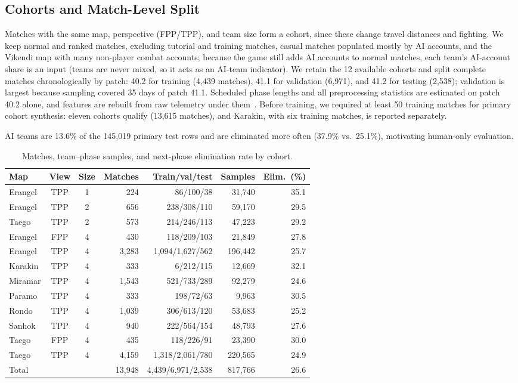 \documentclass[sigconf,anonymous,nonacm]{acmart}
\begin{document}
\subsection{Cohorts and Match-Level Split}
\label{sec:method:cohort}
Matches with the same map, perspective (FPP/TPP), and team size form a cohort, since these change travel distances and fighting.
We keep normal and ranked matches, excluding tutorial and training matches, casual matches populated mostly by AI accounts, and the Vikendi map with many non-player combat accounts; because the game still adds AI accounts to normal matches, each team's AI-account share is an input (teams are never mixed, so it acts as an AI-team indicator).
We retain the 12 available cohorts and split complete matches chronologically by patch: 40.2 for training (4,439 matches), 41.1 for validation (6,971), and 41.2 for testing (2,538); validation is largest because sampling covered 35 days of patch 41.1. Scheduled phase lengths and all preprocessing statistics are estimated on patch 40.2 alone, and features are rebuilt from raw telemetry under them~\cite{Kaufman12}. Before training, we required at least 50 training matches for primary cohort synthesis: eleven cohorts qualify (13,615 matches), and Karakin, with six training matches, is reported separately.

AI teams are 13.6\% of the 145,019 primary test rows and are eliminated more often (37.9\% vs.\ 25.1\%), motivating human-only evaluation.

\begin{table}[t]
\centering
\caption{Matches, team--phase samples, and next-phase elimination rate by cohort.}
\label{tab:cohorts}
\footnotesize
\setlength{\tabcolsep}{2.7pt}
\begin{tabular}{lccrrrr}
\hline
Map & View & Size & Matches & Train/val/test & Samples & Elim.\ (\%) \\
\hline
Erangel & TPP & 1 & 224 & 86/100/38 & 31,740 & 35.1 \\
Erangel & TPP & 2 & 656 & 238/308/110 & 59,170 & 29.5 \\
Taego & TPP & 2 & 573 & 214/246/113 & 47,223 & 29.2 \\
Erangel & FPP & 4 & 430 & 118/209/103 & 21,849 & 27.8 \\
Erangel & TPP & 4 & 3,283 & 1,094/1,627/562 & 196,442 & 25.7 \\
Karakin & TPP & 4 & 333 & 6/212/115 & 12,669 & 32.1 \\
Miramar & TPP & 4 & 1,543 & 521/733/289 & 92,279 & 24.6 \\
Paramo & TPP & 4 & 333 & 198/72/63 & 9,963 & 30.5 \\
Rondo & TPP & 4 & 1,039 & 306/613/120 & 53,683 & 25.2 \\
Sanhok & TPP & 4 & 940 & 222/564/154 & 48,793 & 27.6 \\
Taego & FPP & 4 & 435 & 118/226/91 & 23,390 & 30.0 \\
Taego & TPP & 4 & 4,159 & 1,318/2,061/780 & 220,565 & 24.9 \\
\hline
Total & & & 13,948 & 4,439/6,971/2,538 & 817,766 & 26.6 \\
\hline
\end{tabular}
\end{table}
\end{document}
